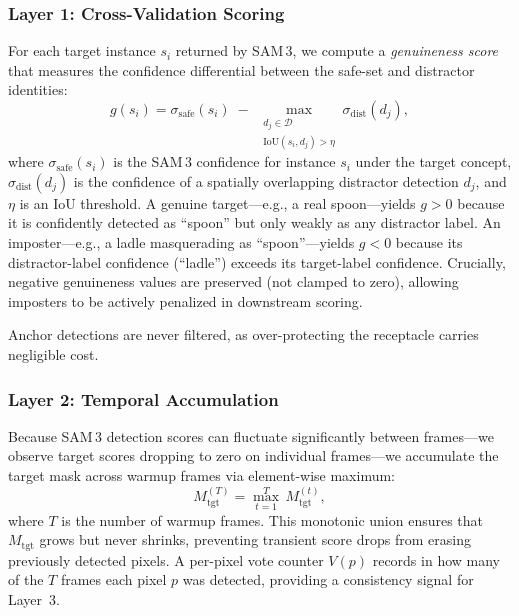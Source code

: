 \subsubsection{Layer 1: Cross-Validation Scoring}
\label{sec:crossval}

For each target instance $s_i$ returned by SAM\,3, we compute a \emph{genuineness score} that measures the confidence differential between the safe-set and distractor identities:
\begin{equation}
    g(s_i) = \sigma_{\text{safe}}(s_i) \;-\; \max_{\substack{d_j \in \mathcal{D} \\ \text{IoU}(s_i, d_j) > \eta}} \sigma_{\text{dist}}(d_j),
    \label{eq:genuineness}
\end{equation}
where $\sigma_{\text{safe}}(s_i)$ is the SAM\,3 confidence for instance $s_i$ under the target concept, $\sigma_{\text{dist}}(d_j)$ is the confidence of a spatially overlapping distractor detection $d_j$, and $\eta$ is an IoU threshold. A genuine target---e.g., a real spoon---yields $g > 0$ because it is confidently detected as ``spoon'' but only weakly as any distractor label. An imposter---e.g., a ladle masquerading as ``spoon''---yields $g < 0$ because its distractor-label confidence (``ladle'') exceeds its target-label confidence. Crucially, negative genuineness values are preserved (not clamped to zero), allowing imposters to be actively penalized in downstream scoring.

Anchor detections are never filtered, as over-protecting the receptacle carries negligible cost.

\subsubsection{Layer 2: Temporal Accumulation}
\label{sec:accumulation}

Because SAM\,3 detection scores can fluctuate significantly between frames---we observe target scores dropping to zero on individual frames---we accumulate the target mask across warmup frames via element-wise maximum:
\begin{equation}
    M_{\text{tgt}}^{(T)} = \max_{t=1}^{T} \, M_{\text{tgt}}^{(t)},
    \label{eq:accumulation}
\end{equation}
where $T$ is the number of warmup frames. This monotonic union ensures that $M_{\text{tgt}}$ grows but never shrinks, preventing transient score drops from erasing previously detected pixels. A per-pixel vote counter $V(p)$ records in how many of the $T$ frames each pixel $p$ was detected, providing a consistency signal for Layer~3.

